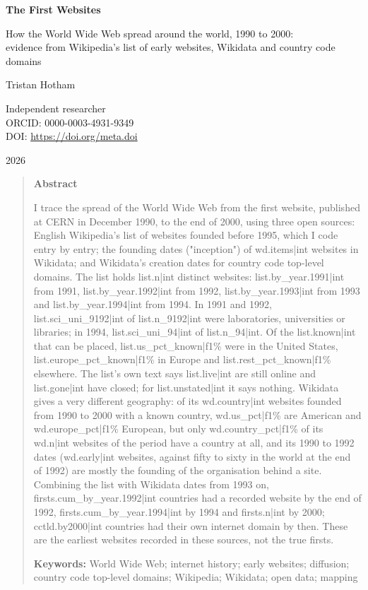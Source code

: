 \documentclass[11pt,a4paper]{article}
\begin{document}
\begin{center}
{\Large\bfseries The First Websites\par}
\vspace{0.4em}
{\large How the World Wide Web spread around the world, 1990 to 2000:\\evidence from Wikipedia's list of early websites, Wikidata and country code domains\par}
\vspace{1.2em}
{\large Tristan Hotham\par}
\vspace{0.3em}
{\small Independent researcher\\
ORCID: 0000-0003-4931-9349\\
DOI: \href{https://doi.org/{{meta.doi}}}{https://doi.org/{{meta.doi}}}\par}
\vspace{0.8em}
2026
\end{center}

\begin{quote}
\small
\begin{center}\textbf{Abstract}\end{center}
I trace the spread of the World Wide Web from the first website, published at CERN in December 1990, to the end of 2000, using three open sources: English Wikipedia's list of websites founded before 1995, which I code entry by entry; the founding dates ("inception") of {{wd.items|int}} websites in Wikidata; and Wikidata's creation dates for country code top-level domains. The list holds {{list.n|int}} distinct websites: {{list.by_year.1991|int}} from 1991, {{list.by_year.1992|int}} from 1992, {{list.by_year.1993|int}} from 1993 and {{list.by_year.1994|int}} from 1994. In 1991 and 1992, {{list.sci_uni_9192|int}} of {{list.n_9192|int}} were laboratories, universities or libraries; in 1994, {{list.sci_uni_94|int}} of {{list.n_94|int}}. Of the {{list.known|int}} that can be placed, {{list.us_pct_known|f1}}\% were in the United States, {{list.europe_pct_known|f1}}\% in Europe and {{list.rest_pct_known|f1}}\% elsewhere. The list's own text says {{list.live|int}} are still online and {{list.gone|int}} have closed; for {{list.unstated|int}} it says nothing. Wikidata gives a very different geography: of its {{wd.country|int}} websites founded from 1990 to 2000 with a known country, {{wd.us_pct|f1}}\% are American and {{wd.europe_pct|f1}}\% European, but only {{wd.country_pct|f1}}\% of its {{wd.n|int}} websites of the period have a country at all, and its 1990 to 1992 dates ({{wd.early|int}} websites, against fifty to sixty in the world at the end of 1992) are mostly the founding of the organisation behind a site. Combining the list with Wikidata dates from 1993 on, {{firsts.cum_by_year.1992|int}} countries had a recorded website by the end of 1992, {{firsts.cum_by_year.1994|int}} by 1994 and {{firsts.n|int}} by 2000; {{cctld.by2000|int}} countries had their own internet domain by then. These are the earliest websites recorded in these sources, not the true firsts.

\textbf{Keywords:} World Wide Web; internet history; early websites; diffusion; country code top-level domains; Wikipedia; Wikidata; open data; mapping
\end{quote}
\end{document}
